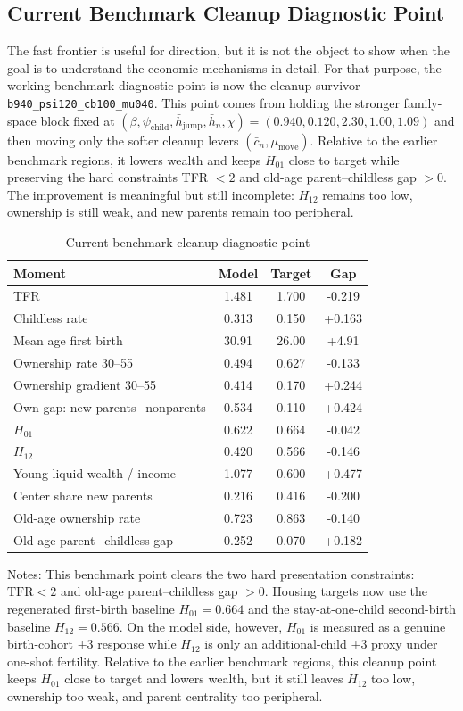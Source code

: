 \documentclass[11pt]{article}
\begin{document}
\subsection{Current Benchmark Cleanup Diagnostic Point}

The fast frontier is useful for direction, but it is not the object to show when the goal is to understand the economic mechanisms in detail. For that purpose, the working benchmark diagnostic point is now the cleanup survivor \texttt{b940\_psi120\_cb100\_mu040}. This point comes from holding the stronger family-space block fixed at $(\beta,\psi_{\text{child}},\bar h_{\text{jump}},\bar h_n,\chi)=(0.940,0.120,2.30,1.00,1.09)$ and then moving only the softer cleanup levers $(\bar c_n,\mu_{\text{move}})$. Relative to the earlier benchmark regions, it lowers wealth and keeps $H_{01}$ close to target while preserving the hard constraints TFR $< 2$ and old-age parent--childless gap $> 0$. The improvement is meaningful but still incomplete: $H_{12}$ remains too low, ownership is still weak, and new parents remain too peripheral.

\begin{table}[!htbp]
\centering
\caption{Current benchmark cleanup diagnostic point}
\label{tab:admissible_benchmark_point}
\small
\begin{tabular}{lccc}
\toprule
Moment & Model & Target & Gap \\
\midrule
TFR & 1.481 & 1.700 & -0.219 \\
Childless rate & 0.313 & 0.150 & +0.163 \\
Mean age first birth & 30.91 & 26.00 & +4.91 \\
Ownership rate 30--55 & 0.494 & 0.627 & -0.133 \\
Ownership gradient 30--55 & 0.414 & 0.170 & +0.244 \\
Own gap: new parents$-$nonparents & 0.534 & 0.110 & +0.424 \\
$H_{01}$ & 0.622 & 0.664 & -0.042 \\
$H_{12}$ & 0.420 & 0.566 & -0.146 \\
Young liquid wealth / income & 1.077 & 0.600 & +0.477 \\
Center share new parents & 0.216 & 0.416 & -0.200 \\
Old-age ownership rate & 0.723 & 0.863 & -0.140 \\
Old-age parent$-$childless gap & 0.252 & 0.070 & +0.182 \\
\bottomrule
\end{tabular}

\medskip
{\footnotesize Notes: This benchmark point clears the two hard presentation constraints: $\text{TFR}<2$ and old-age parent--childless gap $>0$. Housing targets now use the regenerated first-birth baseline $H_{01}=0.664$ and the stay-at-one-child second-birth baseline $H_{12}=0.566$. On the model side, however, $H_{01}$ is measured as a genuine birth-cohort $+3$ response while $H_{12}$ is only an additional-child $+3$ proxy under one-shot fertility. Relative to the earlier benchmark regions, this cleanup point keeps $H_{01}$ close to target and lowers wealth, but it still leaves $H_{12}$ too low, ownership too weak, and parent centrality too peripheral.}
\end{table}
\end{document}
